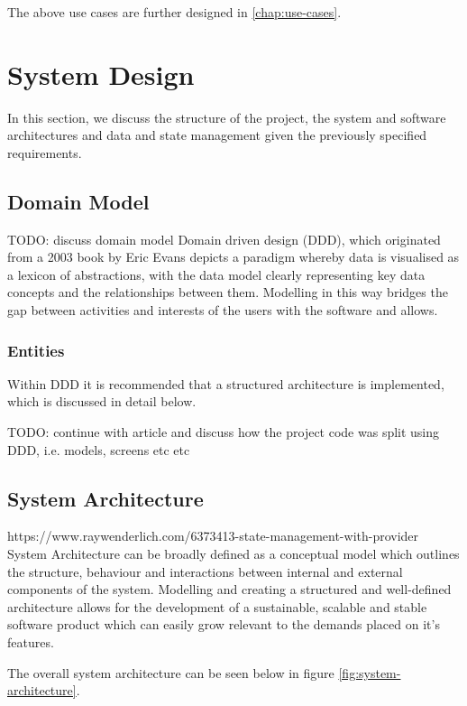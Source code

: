 \documentclass[12pt]{article}
\begin{document}
	The above use cases are further designed in \autoref{chap:use-cases}.

	
	\section{System Design}
	In this section, we discuss the structure of the project, the system and software architectures and data and state management given the previously specified requirements. 
	
	\subsection{Domain Model}
	TODO: discuss domain model
	Domain driven design (DDD), which originated from a 2003 book by Eric Evans \cite{evansDomainDrivenDesignTackling2003} depicts a paradigm whereby data is visualised as a lexicon of abstractions, with the data model clearly representing key data concepts and the relationships between them. Modelling in this way bridges the gap between activities and interests of the users with the software and allows.
	
	
	
	
	\subsubsection{Entities}
	
	Within DDD it is recommended that a structured architecture is implemented, which is discussed in detail below.
	
	TODO: continue with article	and discuss how the project code was split using DDD, i.e. models, screens etc etc
	
	\subsection{System Architecture}
	https://www.raywenderlich.com/6373413-state-management-with-provider
	System Architecture can be broadly defined as a conceptual model which outlines the structure, behaviour and interactions between internal and external components of the system. Modelling and creating a structured and well-defined architecture allows for the development of a sustainable, scalable and stable software product which can easily grow relevant to the demands placed on it's features.
	
	The overall system architecture can be seen below in figure \ref{fig:system-architecture}.
	
\end{document}
